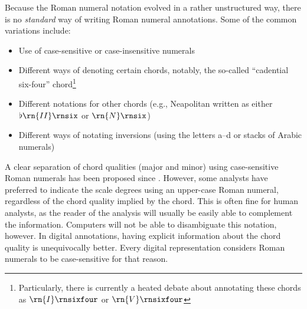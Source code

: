 

Because the Roman numeral notation evolved in a rather
unstructured way, there is no \emph{standard} way of writing
Roman numeral annotations. 
Some of the common variations include:

\begin{itemize}
    \item Use of case-sensitive or case-insensitive numerals
    \item Different ways of denoting certain chords,
    notably, the so-called ``cadential six-four''
    chord\footnote{Particularly, there is currently a heated
    debate about annotating these chords as
    $\rn{I}\rnsixfour$ or $\rn{V}\rnsixfour$}
    \item Different notations for other chords (e.g.,
    Neapolitan written as either $\flat\rn{II}\rnsix$ or
    $\rn{N}\rnsix$)
    \item Different ways of notating inversions (using the
    letters a--d or stacks of Arabic numerals)
\end{itemize}

A clear separation of chord qualities (major and minor)
using case-sensitive Roman numerals has been proposed since
\textcite{weber1817versuch}. However, some analysts have
preferred to indicate the scale degrees using an upper-case
Roman numeral, regardless of the chord quality implied by
the chord. This is often fine for human analysts, as the
reader of the analysis will usually be easily able to
complement the information. Computers will not be able to
disambiguate this notation, however. In digital annotations,
having explicit information about the chord quality is
unequivocally better. Every digital representation considers
Roman numerals to be case-sensitive for that reason.


